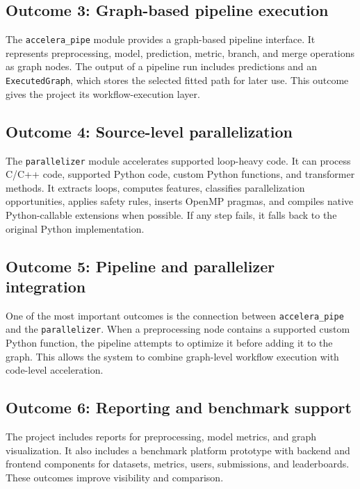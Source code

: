 \documentclass[12pt,a4paper]{report}
\begin{document}
\subsection*{Outcome 3: Graph-based pipeline execution}

The \texttt{accelera\_pipe} module provides a graph-based pipeline interface.
It represents preprocessing, model, prediction, metric, branch, and merge
operations as graph nodes. The output of a pipeline run includes predictions and
an \texttt{ExecutedGraph}, which stores the selected fitted path for later use.
This outcome gives the project its workflow-execution layer.

\subsection*{Outcome 4: Source-level parallelization}

The \texttt{parallelizer} module accelerates supported loop-heavy code. It can
process C/C++ code, supported Python code, custom Python functions, and
transformer methods. It extracts loops, computes features, classifies
parallelization opportunities, applies safety rules, inserts OpenMP pragmas, and
compiles native Python-callable extensions when possible. If any step fails, it
falls back to the original Python implementation.

\subsection*{Outcome 5: Pipeline and parallelizer integration}

One of the most important outcomes is the connection between
\texttt{accelera\_pipe} and the \texttt{parallelizer}. When a preprocessing node
contains a supported custom Python function, the pipeline attempts to optimize
it before adding it to the graph. This allows the system to combine graph-level
workflow execution with code-level acceleration.

\subsection*{Outcome 6: Reporting and benchmark support}

The project includes reports for preprocessing, model metrics, and graph
visualization. It also includes a benchmark platform prototype with backend and
frontend components for datasets, metrics, users, submissions, and leaderboards.
These outcomes improve visibility and comparison.
\end{document}
